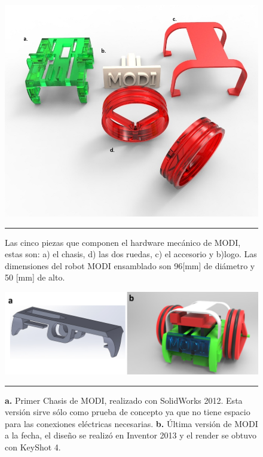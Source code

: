 \begin{figure}[htbp]
	\centering
		\includegraphics[width=\textwidth]{./Figures/MODI/piezas.jpg}
		\rule{35em}{0.5pt}
	\caption[Piezas 3D]{Las cinco piezas que componen el hardware mecánico de MODI, estas son: a) el chasis, d) las dos ruedas, c) el accesorio y b)logo. Las dimensiones del robot MODI ensamblado son 96[mm] de diámetro y 50 [mm] de alto.}
	\label{fig:Render Piezas 3D}
\end{figure}

\begin{figure}[htbp]
	\centering
		\includegraphics[width=\textwidth]{./Figures/MODI/compRender.png}
		\rule{35em}{0.5pt}
	\caption[Comparación entre el primer render realizado y el último]{\textbf{ a.} Primer Chasis de MODI, realizado con SolidWorks 2012. Esta versión sirve sólo como prueba de concepto ya que no tiene espacio para las conexiones eléctricas necesarias.\textbf{ b.} Última versión de MODI a la fecha, el diseño se realizó en Inventor 2013 y el render se obtuvo con KeyShot 4.}
	\label{fig:compRender}
\end{figure}	

